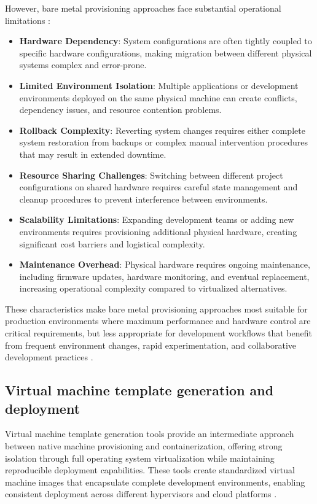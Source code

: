 However, bare metal provisioning approaches face substantial operational limitations \citep{nemethUNIXLinuxSystem2017,portnoyVirtualizationEssentials2016}:
\begin{itemize}
    \item \textbf{Hardware Dependency}: System configurations are often tightly coupled to specific hardware configurations, making migration between different physical systems complex and error-prone.
    \item \textbf{Limited Environment Isolation}: Multiple applications or development environments deployed on the same physical machine can create conflicts, dependency issues, and resource contention problems.
    \item \textbf{Rollback Complexity}: Reverting system changes requires either complete system restoration from backups or complex manual intervention procedures that may result in extended downtime.
    \item \textbf{Resource Sharing Challenges}: Switching between different project configurations on shared hardware requires careful state management and cleanup procedures to prevent interference between environments.
    \item \textbf{Scalability Limitations}: Expanding development teams or adding new environments requires provisioning additional physical hardware, creating significant cost barriers and logistical complexity.
    \item \textbf{Maintenance Overhead}: Physical hardware requires ongoing maintenance, including firmware updates, hardware monitoring, and eventual replacement, increasing operational complexity compared to virtualized alternatives.
\end{itemize}

These characteristics make bare metal provisioning approaches most suitable for production environments where maximum performance and hardware control are critical requirements, but less appropriate for development workflows that benefit from frequent environment changes, rapid experimentation, and collaborative development practices \citep{felterUpdatedPerformanceComparison2015}.

\subsection{Virtual machine template generation and deployment}
Virtual machine template generation tools provide an intermediate approach between native machine provisioning and containerization, offering strong isolation through full operating system virtualization while maintaining reproducible deployment capabilities.
These tools create standardized virtual machine images that encapsulate complete development environments, enabling consistent deployment across different hypervisors and cloud platforms \citep{kolyasnikovExperimentalEvaluationVirtual2019}.

